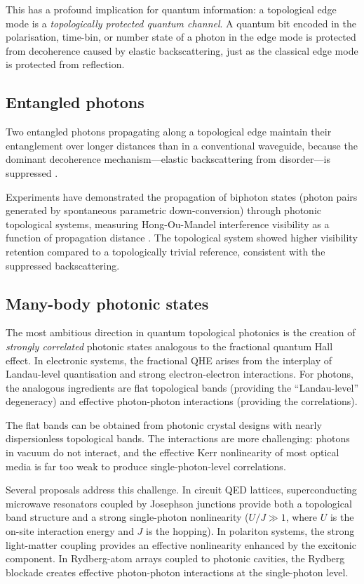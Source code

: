 This has a profound implication for quantum information: a topological
edge mode is a \emph{topologically protected quantum channel}.  A
quantum bit encoded in the polarisation, time-bin, or number state of
a photon in the edge mode is protected from decoherence caused by
elastic backscattering, just as the classical edge mode is protected
from reflection.

\subsection{Entangled photons}
\label{sec:ch18-entangled}

Two entangled photons propagating along a topological edge maintain
their entanglement over longer distances than in a conventional
waveguide, because the dominant decoherence mechanism---elastic
backscattering from disorder---is suppressed
\cite{mittal2020tunable}.

Experiments have demonstrated the propagation of biphoton states
(photon pairs generated by spontaneous parametric down-conversion)
through photonic topological systems, measuring Hong-Ou-Mandel
interference visibility as a function of propagation distance
\cite{li2022higher}.  The
topological system showed higher visibility retention compared to a
topologically trivial reference, consistent with the suppressed
backscattering.

\subsection{Many-body photonic states}
\label{sec:ch18-many-body}

The most ambitious direction in quantum topological photonics is the
creation of \emph{strongly correlated} photonic states analogous to
the fractional quantum Hall effect.  In electronic systems, the
fractional QHE arises from the interplay of Landau-level quantisation
and strong electron-electron interactions.  For photons, the analogous
ingredients are flat topological bands (providing the
``Landau-level'' degeneracy) and effective photon-photon interactions
(providing the correlations).

The flat bands can be obtained from photonic crystal designs with nearly
dispersionless topological bands.  The interactions are more
challenging: photons in vacuum do not interact, and the effective Kerr
nonlinearity of most optical media is far too weak to produce
single-photon-level correlations.

Several proposals address this challenge.  In circuit QED lattices,
superconducting microwave resonators coupled by Josephson junctions
provide both a topological band structure and a strong single-photon
nonlinearity ($U/J\gg 1$, where $U$ is the on-site interaction energy
and $J$ is the hopping).  In polariton systems, the strong
light-matter coupling provides an effective nonlinearity enhanced by
the excitonic component.  In Rydberg-atom arrays coupled to photonic
cavities, the Rydberg blockade creates effective photon-photon
interactions at the single-photon level.


